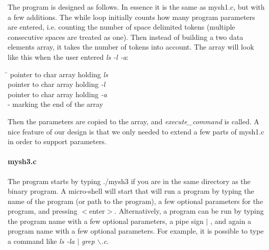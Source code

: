 \documentclass[a4paper,10pt]{article}
\begin{document}
The program is designed as follows. In essence it is the same as mysh1.c, but with a few additions. The while loop initially counts how many program parameters are entered, i.e. counting the number of space delimited tokens (multiple consecutive spaces are treated as one). Then instead of building a two data elements array, it takes the number of tokens into account. The array will look like this when the user entered \emph{ls -l -a}:
\begin{tabbing}
\hspace{20pt}\=\kill
 \> [0] pointer to char array holding \emph{ls}\\ 
 \> [1] pointer to char array holding \emph{-l}\\
 \> [2] pointer to char array holding \emph{-a}\\
  - marking the end of the array
\end{tabbing}
Then the parameters are copied to the array, and \emph{execute\_command} is called.
A nice feature of our design is that we only needed to extend a few parts of mysh1.c in order to support parameters.

\paragraph{mysh3.c} The program starts by typing ./mysh3 if you are in the same directory as the binary program. A micro-shell will start that will run a program by typing the name of the program (or path to the program), a few optional parameters for the program, and pressing $<$enter$>$. Alternatively, a program can be run by typing the program name with a few optional parameters, a pipe sign $\mid$ , and again a program name with a few optional parameters. For example, it is possible to type a command like \emph{ls -la $\mid$ grep $\backslash$.c}.
\end{document}
